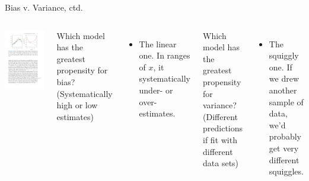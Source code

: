\documentclass[aspectratio=169, handout]{beamer}
\begin{document}
\begin{frame}{Bias v. Variance, ctd.}


\begin{columns}

\includegraphics[scale=1]{figures/islr2_9a.pdf}


Which model has the greatest propensity for bias? (Systematically high or low estimates)
\begin{itemize}
\item<2-> The linear one.  In ranges of $x$, it systematically under- or over-estimates. 
\end{itemize}

\hspace{5mm}

Which model has the greatest propensity for variance? (Different predictions if fit with different data sets)
\begin{itemize}
\item<3-> The squiggly one.  If we drew another sample of data, we'd probably get very different squiggles.
\end{itemize}
\end{columns}



\end{frame}
\end{document}
